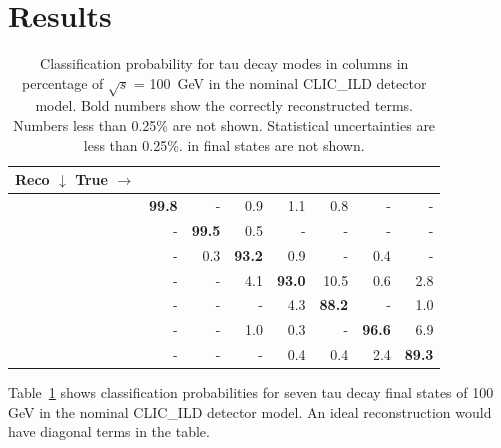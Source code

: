 \documentclass[a4paper,11pt]{article}
\newcommand{\decayElectronShort}{\Pem\PAGne}
\newcommand{\decayMuonShort}{\PGmm\PAGnGm}
\newcommand{\decayPionShort}{\PGpm}
\newcommand{\decayRhoShort}{\PGrP{\PGpm\PGpz}}
\newcommand{\decayAiPhotonShort}{\PaDoP{\PGpm\PGpz\PGpz}}
\newcommand{\decayAiPionShort}{\PaDoP{\PGpm\PGpm\PGpp}}
\newcommand{\decayThreePionPhotonShort}{\PGpm\PGpm\PGpp\PGpz}
\newcommand{\rootS}{\ensuremath{\sqrt{s}} }
\begin{document}
\section{Results}

\begin{table}[htbp]
\centering
\caption{\label{tab:sel_example} Classification probability for tau decay modes in columns in percentage of \rootS = 100 \,GeV in the nominal CLIC\_ILD detector model. Bold numbers show the correctly reconstructed terms. Numbers less than 0.25\% are not shown. Statistical uncertainties are less than 0.25\%. \PGnGt in final states are not shown.}
\smallskip
\small
\begin{tabular}{| l | r | r | r | r | r | r | r |}
\hline
  \textbf{Reco $\downarrow$ True $\to$}  & \textbf{\decayElectronShort} & \textbf{\decayMuonShort} &\textbf{\decayPionShort} & \textbf{\decayRhoShort} &\textbf{\decayAiPhotonShort} &\textbf{\decayAiPionShort} &\textbf{\decayThreePionPhotonShort} \\
\hline

\textbf{\decayElectronShort}&\textbf{99.8}&-&0.9&1.1&0.8&-&-\\
\textbf{\decayMuonShort}&-&\textbf{99.5}&0.5&-&-&-&-\\
\textbf{\decayPionShort}&-&0.3&\textbf{93.2}&0.9&-&0.4&-\\
\textbf{\decayRhoShort}&-&-&4.1&\textbf{93.0}&10.5&0.6&2.8\\
\textbf{\decayAiPhotonShort}&-&-&-&4.3&\textbf{88.2}&-&1.0\\
\textbf{\decayAiPionShort}&-&-&1.0&0.3&-&\textbf{96.6}&6.9\\
\textbf{\decayThreePionPhotonShort}&-&-&-&0.4&0.4&2.4&\textbf{89.3}\\

\hline
\end{tabular}
\end{table}

Table~\ref{tab:sel_example} shows classification probabilities for seven tau decay final states of 100 \,GeV in  the nominal CLIC\_ILD detector model. An ideal reconstruction would have diagonal terms in the table. 

\end{document}
